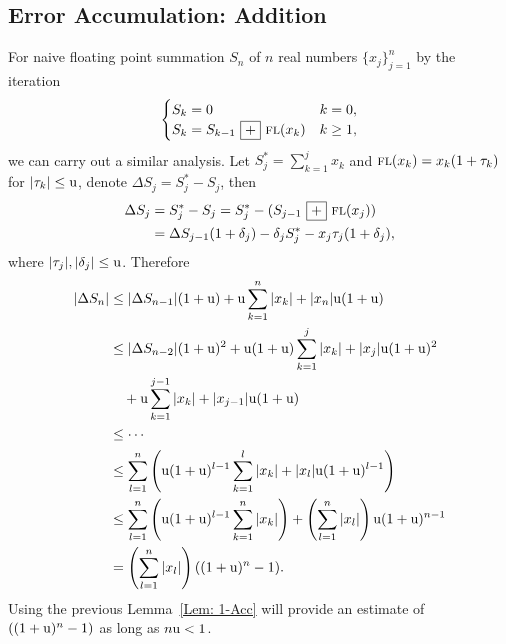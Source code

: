 \subsection{Error Accumulation: Addition}
\label{SSec: 1-Err-Acc-Add}
For naive floating point summation $S_n$ of $n$ real numbers $\{x_j \}_{j=1}^n$ by the iteration 
\begin{equation*}
    \begin{cases}
        S_k = 0 & k=0,\\
        S_k = S_{k-1}~\boxed{+}~ {\textsc{fl}}(x_k) & k\ge 1,
    \end{cases}
\end{equation*}
we can carry out a similar analysis. Let $S^{\ast}_j = \sum_{k=1}^j x_k$ and  ${\textsc{fl}}(x_k) = x_k ( 1 + \tau_k)$ for $|\tau_k|\le \textup{u}$, denote $\Delta S_j = S_j^{\ast} - S_j$, then
\begin{equation*}
    \begin{aligned}
        \Delta S_j &= S_j^{\ast} - S_j = S_{j}^{\ast} - ( S_{j-1}~\boxed{+}~ {\textsc{fl}}(x_j)) \\
        &= \Delta S_{j-1}(1 + \delta_j) - \delta_j S_{j}^{\ast} - x_j\tau_j(1+\delta_j),
    \end{aligned}
\end{equation*}
where $|\tau_j|, |\delta_j|\le \textup{u}$. Therefore
\begin{equation*}
    \begin{aligned}
        |\Delta S_n|&\le |\Delta S_{n-1}|(1 + \textup{u}) + \textup{u} \sum_{k=1}^n |x_k| + |x_n| \textup{u}(1 + \textup{u}) \\
        &\le |\Delta S_{n-2}|(1 + \textup{u})^2 + \textup{u}(1+\textup{u})  \sum_{k=1}^j |x_k| + |x_j| \textup{u}(1 + \textup{u})^2 \\
        &\quad +  \textup{u} \sum_{k=1}^{j-1} |x_k| + |x_{j-1}| \textup{u}(1 + \textup{u})\\
        &\le  \cdots \\
        &\le  \sum_{l=1}^{n} \left( \textup{u}(1 + \textup{u})^{l-1} 
 \sum_{k=1}^l |x_k| + |x_{l}|\text{u}(1 + \textup{u})^{l-1} \right) \\
        & \le \sum_{l=1}^{n} \left( \textup{u}(1 + \textup{u})^{l-1} \sum_{k=1}^n |x_k|  \right) + \left(\sum_{l=1}^n |x_{l}|\right)\text{u}(1 + \textup{u})^{n-1}\\
        &= \left(\sum_{l=1}^n |x_{l}|\right) ((1 + \textup{u})^n - 1).
        \end{aligned}
\end{equation*}
Using the previous Lemma~\ref{Lem: 1-Acc} will provide an estimate of $ ((1 + \textup{u})^n - 1)$ as long as $n\textup{u} < 1$.

